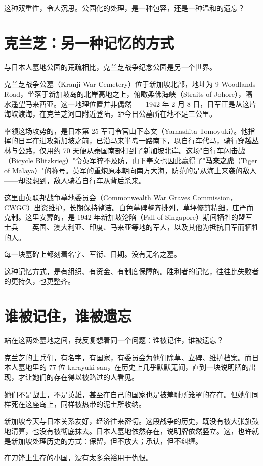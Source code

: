 这种双重性，令人沉思。公园化的处理，是一种包容，还是一种温和的遗忘？

\section{克兰芝：另一种记忆的方式}

与日本人墓地公园的荒疏相比，克兰芝战争纪念公园是另一个世界。

克兰芝战争公墓（Kranji War Cemetery）位于新加坡北部，地址为 9 Woodlands Road，坐落于新加坡岛的北岸高地之上，俯瞰柔佛海峡（Straits of Johore），隔水遥望马来西亚。这一地理位置并非偶然——1942 年 2 月 8 日，日军正是从这片海峡渡海，在克兰芝河口附近登陆，距今日公墓所在地不足三公里。

率领这场攻势的，是日本第 25 军司令官山下奉文（Yamashita Tomoyuki）。他指挥的日军在进攻新加坡之前，已沿马来半岛一路南下，以自行车代马，骑行穿越丛林与公路，仅用约 70 天便从泰国南部打到了新加坡北岸。这场"自行车闪击战（Bicycle Blitzkrieg）"令英军猝不及防，山下奉文也因此赢得了"\textbf{马来之虎}（Tiger of Malaya）"的称号。英军的重炮原本朝向南方大海，防范的是从海上来袭的敌人——却没想到，敌人骑着自行车从背后杀来。

这里由英联邦战争墓地委员会（Commonwealth War Graves Commission，CWGC）出资维护，长期保持整洁。白色墓碑整齐排列，草坪修剪精细，庄严而克制。这里安葬的，是 1942 年新加坡沦陷（Fall of Singapore）期间牺牲的盟军士兵——英国、澳大利亚、印度、马来亚等地的军人，以及其他为抵抗日军而牺牲的人。

每一块墓碑上都刻着名字、军衔、日期。没有无名之墓。

这种记忆方式，是有组织、有资金、有制度保障的。胜利者的记忆，往往比失败者的更持久，也更整齐。

\section{谁被记住，谁被遗忘}

站在这两处墓地之间，我反复想着同一个问题：谁被记住，谁被遗忘？

克兰芝的士兵们，有名字，有国家，有委员会为他们除草、立碑、维护档案。而日本人墓地里的 77 位 karayuki-san，在历史上几乎默默无闻，直到一块说明牌的出现，才让她们的存在得以被路过的人看见。

她们不是战士，不是英雄，甚至在自己的国家也是被羞耻所笼罩的存在。但她们同样死在这座岛上，同样被热带的泥土所收纳。

新加坡今天与日本关系友好，经济往来密切。这段战争的历史，既没有被大张旗鼓地清算，也没有被彻底抹去。日本人墓地依然存在，说明牌依然竖立。这，也许就是新加坡处理历史的方式：保留，但不放大；承认，但不纠缠。

在刀锋上生存的小国，没有太多余裕用于仇恨。
